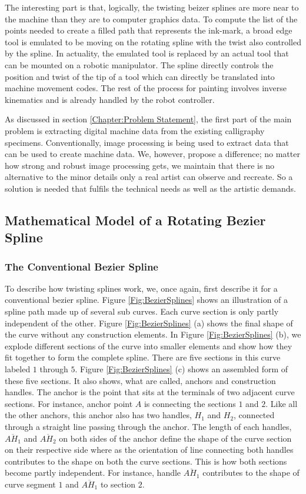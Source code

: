     The interesting part is that, logically, the twisting beizer splines are more near to the machine than they are to computer graphics data. To compute the list of the points needed to create a filled path that represents the ink-mark, a broad edge tool is emulated to be moving on the rotating spline with the twist also controlled by the spline. In actuality, the emulated tool is replaced by an actual tool that can be mounted on a robotic manipulator. The spline directly controls the position and twist of the tip of a tool which can directly be translated into machine movement codes. The rest of the process for painting involves inverse kinematics and is already handled by the robot controller.

    As discussed in section \ref{Chapter:Problem Statement}, the first part of the main problem is extracting digital machine data from the existing calligraphy specimens. Conventionally, image processing is being used to extract data that can be used to create machine data. We, however, propose a difference; no matter how strong and robust image processing gets, we maintain that there is no alternative to the minor details only a real artist can observe and recreate. So a solution is needed that fulfils the technical needs as well as the artistic demands.

    \subsection{Mathematical Model of a Rotating Bezier Spline}
    \subsubsection{The Conventional Bezier Spline}
         To describe how twisting splines work, we, once again, first describe it for a conventional bezier spline. Figure \ref{Fig:BezierSplines} shows an illustration of a spline path made up of several sub curves. Each curve section is only partly independent of the other. Figure \ref{Fig:BezierSplines} (a) shows the final shape of the curve without any construction elements. In Figure \ref{Fig:BezierSplines} (b), we explode different sections of the curve into smaller elements and show how they fit together to form the complete spline. There are five sections in this curve labeled $1$ through $5$. Figure \ref{Fig:BezierSplines} (c) shows an assembled form of these five sections. It also shows, what are called, anchors and construction handles. The anchor is the point that sits at the terminals of two adjacent curve sections. For instance, anchor point $A$  is connecting the sections $1$ and $2$. Like all the other anchors, this anchor also has two handles, $H_1$ and $H_2$, connected through a straight line passing through the anchor. The length of each handles, $\overline{AH_1}$  and $\overline{AH_2}$ on both sides of the anchor define the shape of the curve section on their respective side where as the orientation of line connecting both handles contributes to the shape on both the curve sections. This is how both sections become partly independent. For instance, handle $\overline{AH_1}$ contributes to the shape of curve segment $1$ and $\overline{AH_1}$ to section $2$.




